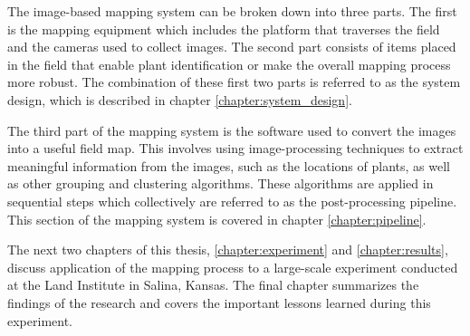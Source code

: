 The image-based mapping system can be broken down into three parts.  The first is the mapping equipment which includes the platform that traverses the field and the cameras used to collect images.  The second part consists of items placed in the field that enable plant identification or make the overall mapping process more robust.  The combination of these first two parts is referred to as the system design, which is described in chapter \ref{chapter:system_design}. 

The third part of the mapping system is the software used to convert the images into a useful field map.  This involves using image-processing techniques to extract meaningful information from the images, such as the locations of plants, as well as other grouping and clustering algorithms.  These algorithms are applied in sequential steps which collectively are referred to as the post-processing pipeline.  This section of the mapping system is covered in chapter \ref{chapter:pipeline}. 

The next two chapters of this thesis, \ref{chapter:experiment} and \ref{chapter:results}, discuss application of the mapping process to a large-scale experiment conducted at the Land Institute in Salina, Kansas.  The final chapter summarizes the findings of the research and covers the important lessons learned during this experiment.
